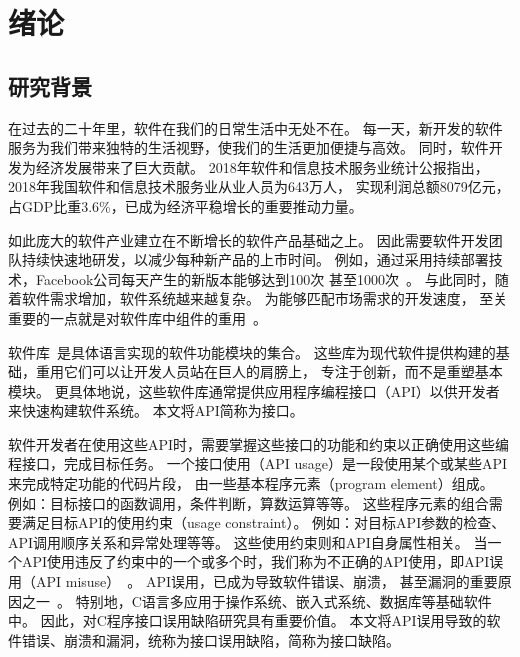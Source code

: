 \chapter{绪论}
\label{cha:intro}

\section{研究背景}
在过去的二十年里，软件在我们的日常生活中无处不在。
每一天，新开发的软件服务为我们带来独特的生活视野，使我们的生活更加便捷与高效。
同时，软件开发为经济发展带来了巨大贡献。
2018年软件和信息技术服务业统计公报指出，
2018年我国软件和信息技术服务业从业人员为643万人，
实现利润总额8079亿元，占GDP比重3.6\%，已成为经济平稳增长的重要推动力量\cite{2018-china-report}。


如此庞大的软件产业建立在不断增长的软件产品基础之上。
因此需要软件开发团队持续快速地研发，以减少每种新产品的上市时间。
例如，通过采用持续部署技术，Facebook公司每天产生的新版本能够达到100次
甚至1000次~\cite{16-icse-continuous}。
与此同时，随着软件需求增加，软件系统越来越复杂。
为能够匹配市场需求的开发速度，
至关重要的一点就是对软件库中组件的重用~\cite{2011-icsr-reuse, 2013-cbse-reuse}。

软件库~\cite{library}是具体语言实现的软件功能模块的集合。
这些库为现代软件提供构建的基础，重用它们可以让开发人员站在巨人的肩膀上，
专注于创新，而不是重塑基本模块。
更具体地说，这些软件库通常提供应用程序编程接口（API）以供开发者来快速构建软件系统。
本文将API简称为接口。


软件开发者在使用这些API时，需要掌握这些接口的功能和约束以正确使用这些编程接口，完成目标任务。
一个接口使用（API usage）是一段使用某个或某些API来完成特定功能的代码片段，
由一些基本程序元素（program element）组成。
例如：目标接口的函数调用，条件判断，算数运算等等。
这些程序元素的组合需要满足目标API的使用约束（usage constraint）。
例如：对目标API参数的检查、API调用顺序关系和异常处理等等。
这些使用约束则和API自身属性相关。
当一个API使用违反了约束中的一个或多个时，我们称为不正确的API使用，即API误用（API misuse）~\cite{16-msr-mubench}。
API误用，已成为导致软件错误、崩溃，
甚至漏洞的重要原因之一~\cite{12-ccs-android,12-ccs-ssl,13-ccs-misuse,13-tosem-missing-call,14-apsys-case,15-icpc-api,16-ase-spec}。
特别地，C语言多应用于操作系统、嵌入式系统、数据库等基础软件中。
因此，对C程序接口误用缺陷研究具有重要价值。
本文将API误用导致的软件错误、崩溃和漏洞，统称为接口误用缺陷，简称为接口缺陷。


